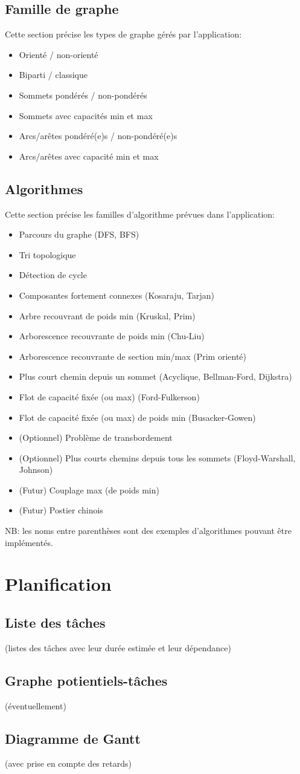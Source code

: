 \documentclass[french]{article}
\begin{document}
		\subsection{Famille de graphe}
			Cette section précise les types de graphe gérés par l'application:
			\begin{itemize}
				\item Orienté / non-orienté
				\item Biparti / classique
				\item Sommets pondérés / non-pondérés
				\item Sommets avec capacités min et max
				\item Arcs/arêtes pondéré(e)s / non-pondéré(e)s
				\item Arcs/arêtes avec capacité min et max
			\end{itemize}
			
		\subsection{Algorithmes}
			Cette section précise les familles d'algorithme prévues dans l'application:
			\begin{itemize}
				\item Parcours du graphe (DFS, BFS)
				\item Tri topologique
				\item Détection de cycle
				\item Composantes fortement connexes (Kosaraju, Tarjan) 
				\item Arbre recouvrant de poids min (Kruskal, Prim)
				\item Arborescence recouvrante de poids min (Chu-Liu)
				\item Arborescence recouvrante de section min/max (Prim orienté)
				\item Plus court chemin depuis un sommet (Acyclique, Bellman-Ford, Dijkstra)
				\item Flot de capacité fixée (ou max) (Ford-Fulkerson)
				\item Flot de capacité fixée (ou max) de poids min (Busacker-Gowen)
				\item (Optionnel) Problème de transbordement
				\item (Optionnel) Plus courts chemins depuis tous les sommets (Floyd-Warshall, Johnson)
				\item (Futur) Couplage max (de poids min)
				\item (Futur) Postier chinois
			\end{itemize}
			NB: les noms entre parenthèses sont des exemples d'algorithmes pouvant être implémentés.
		
	\section{Planification}
		\subsection{Liste des tâches}
			(listes des tâches avec leur durée estimée et leur dépendance)
		\subsection{Graphe potientiels-tâches}
			(éventuellement)
		\subsection{Diagramme de Gantt}
			(avec prise en compte des retards)
			
\end{document}
